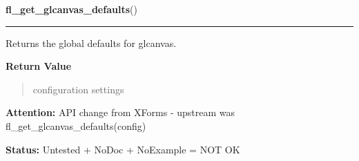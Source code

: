 \hspace{.8\funcindent}\begin{boxedminipage}{\funcwidth}

    \raggedright \textbf{fl\_get\_glcanvas\_defaults}()

    \vspace{-1.5ex}

    \rule{\textwidth}{0.5\fboxrule}
\setlength{\parskip}{2ex}
    Returns the global defaults for glcanvas.

\setlength{\parskip}{1ex}
      \textbf{Return Value}
    \vspace{-1ex}

      \begin{quote}
      configuration settings

      \end{quote}

\textbf{Attention:} API change from XForms - upstream was fl\_get\_glcanvas\_defaults(config)



\textbf{Status:} Untested + NoDoc + NoExample = NOT OK



    \end{boxedminipage}

    \label{xformslib:library:fl_set_glcanvas_attributes}

    \vspace{0.5ex}

